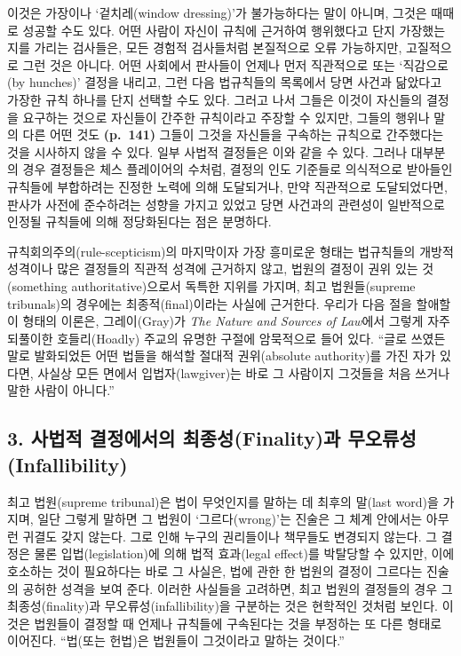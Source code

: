 이것은 가장이나 ‘겉치레(window dressing)’가 불가능하다는 말이 아니며,
그것은 때때로 성공할 수도 있다. 어떤 사람이 자신이 규칙에 근거하여
행위했다고 단지  가장했는지를 가리는
검사들은, 모든 경험적 검사들처럼 본질적으로 오류 가능하지만, 고질적으로
그런 것은 아니다. 어떤 사회에서 판사들이 언제나 먼저 직관적으로 또는
‘직감으로(by hunches)’ 결정을 내리고, 그런 다음 법규칙들의 목록에서 당면
사건과 닮았다고 가장한 규칙 하나를 단지 선택할 수도 있다. 그러고 나서
그들은 이것이 자신들의 결정을 요구하는 것으로 자신들이 간주한 규칙이라고
주장할 수 있지만, 그들의 행위나 말의 다른 어떤 것도 \textbf{(p.~141)}
그들이 그것을 자신들을 구속하는 규칙으로 간주했다는 것을 시사하지 않을
수 있다. 일부 사법적 결정들은 이와 같을 수 있다. 그러나 대부분의 경우
결정들은 체스 플레이어의 수처럼, 결정의 인도 기준들로 의식적으로
받아들인 규칙들에 부합하려는 진정한 노력에 의해 도달되거나, 만약
직관적으로 도달되었다면, 판사가 사전에 준수하려는 성향을 가지고 있었고
당면 사건과의 관련성이 일반적으로 인정될 규칙들에 의해 정당화된다는 점은
분명하다.

규칙회의주의(rule-scepticism)의 마지막이자 가장 흥미로운 형태는
법규칙들의 개방적 성격이나 많은 결정들의 직관적 성격에 근거하지 않고,
법원의 결정이 권위 있는 것(something authoritative)으로서 독특한 지위를
가지며, 최고 법원들(supreme tribunals)의 경우에는 최종적(final)이라는
사실에 근거한다. 우리가 다음 절을 할애할 이 형태의 이론은,
그레이(Gray)가 \emph{The Nature and Sources of Law}에서 그렇게 자주
되풀이한 호들리(Hoadly) 주교의 유명한 구절에 암묵적으로 들어 있다.
“글로 쓰였든 말로 발화되었든 어떤 법들을 해석할 절대적 권위(absolute
authority)를 가진 자가 있다면, 사실상 모든 면에서 입법자(lawgiver)는
바로 그 사람이지 그것들을 처음 쓰거나 말한 사람이 아니다.”

\subsection{3. 사법적 결정에서의 최종성(Finality)과
무오류성(Infallibility)}\label{uxc0acuxbc95uxc801-uxacb0uxc815uxc5d0uxc11cuxc758-uxcd5cuxc885uxc131finalityuxacfc-uxbb34uxc624uxb958uxc131infallibility}

최고 법원(supreme tribunal)은 법이 무엇인지를 말하는 데 최후의 말(last
word)을 가지며, 일단 그렇게 말하면 그 법원이 ‘그르다(wrong)’는 진술은 그
체계 안에서는 아무런 귀결도 갖지 않는다. 그로 인해 누구의 권리들이나
책무들도 변경되지 않는다. 그 결정은 물론 입법(legislation)에 의해 법적
효과(legal effect)를 박탈당할 수 있지만, 이에 호소하는 것이 필요하다는
바로 그 사실은, 법에 관한 한 법원의 결정이 그르다는 진술의 공허한 성격을
보여 준다. 이러한 사실들을 고려하면, 최고 법원의 결정들의 경우 그
최종성(finality)과 무오류성(infallibility)을 구분하는 것은 현학적인
것처럼 보인다. 이것은 법원들이 결정할 때 언제나 규칙들에 구속된다는 것을
부정하는 또 다른 형태로 이어진다. “법(또는 헌법)은 법원들이 그것이라고
말하는 것이다.”

